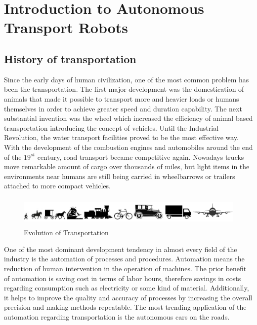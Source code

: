 \documentclass[12pt,english,twoside]{article}
\begin{document}
\section{Introduction to Autonomous Transport Robots}
\subsection{History of transportation}

Since the early days of human civilization, one of the most common problem has been the transportation. The first major development was the domestication of animals that made it possible to transport more and heavier loads or humans themselves in order to achieve greater speed and duration capability. The next substantial invention was the wheel which increased the efficiency of animal based transportation introducing the concept of vehicles. Until the Industrial Revolution, the water transport facilities proved to be the most effective way. With the development of the combustion engines and automobiles around the end of the $19^{st}$ century, road transport became competitive again. Nowadays trucks move remarkable amount of cargo over thousands of miles, but light items in the environments near humans are still being carried in wheelbarrows or trailers attached to more compact vehicles. 

\begin{figure}[h]
	\centering
	\includegraphics[height=1.5cm]{figures/evot.png}
	\caption{Evolution of Transportation \cite{google1}}
\end{figure}

\noindent One of the most dominant development tendency in almost every field of the industry is the automation of processes and procedures. Automation means the reduction of human intervention in the operation of machines. The prior benefit of automation is saving cost in terms of labor hours, therefore savings in costs regarding consumption such as electricity or some kind of material. Additionally, it helps to improve the quality and accuracy of processes by increasing the overall precision and making methods repeatable. The most trending application of the automation regarding transportation is the autonomous cars on the roads.
\end{document}
